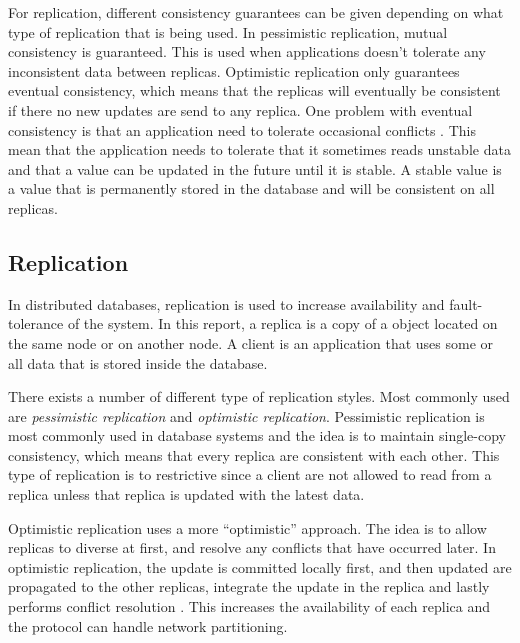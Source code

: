 For replication, different consistency guarantees can be given depending on what type of replication that is being used. In pessimistic replication, mutual consistency is guaranteed. This is used when applications doesn't tolerate any inconsistent data between replicas. Optimistic replication only guarantees eventual consistency, which means that the replicas will eventually be consistent if there no new updates are send to any replica. One problem with eventual consistency is that an application need to tolerate occasional conflicts \cite[]{saito2005}. This mean that the application needs to tolerate that it sometimes reads unstable data and that a value can be updated in the future until it is stable. A stable value is a value that is permanently stored in the database and will be consistent on all replicas.


\subsection{Replication} 
\label{ssub:replication}

In distributed databases, replication is used to increase availability and fault-tolerance of the system. In this report, a replica is a copy of a object located on the same node or on another node. A client is an application that uses some or all data that is stored inside the database. 

There exists a number of different type of replication styles. Most commonly used are \emph{pessimistic replication} and \emph{optimistic replication}. Pessimistic replication is most commonly used in database systems and the idea is to maintain single-copy consistency, which means that every replica are consistent with each other. This type of replication is to restrictive since a client are not allowed to read from a replica unless that replica is updated with the latest data. 

Optimistic replication uses a more ``optimistic'' approach. The idea is to allow replicas to diverse at first, and resolve any conflicts that have occurred later. In optimistic replication, the update is committed locally first, and then updated are propagated to the other replicas, integrate the update in the replica and lastly performs conflict resolution \cite[]{saito2005}. This increases the availability of each replica and the protocol can handle network partitioning.


